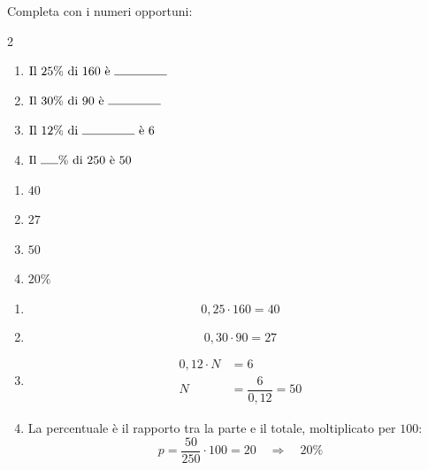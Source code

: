
\begin{question}[ID=1.2, subtitle={Completamento con percentuali — serie 2}, tags={percentuali}, difficulty=facile]
Completa con i numeri opportuni:
\begin{center}\begin{minipage}{0.92\linewidth}
\begin{multicols}{2}
\begin{enumerate}
\item $\text{Il }25\%\text{ di }160\text{ è } \rule{1.5cm}{0.4pt}$
\item $\text{Il }30\%\text{ di }90\text{ è } \rule{1.5cm}{0.4pt}$
\item $\text{Il }12\%\text{ di } \rule{1.5cm}{0.4pt} \text{ è }6$
\item $\text{Il } \rule{0.5cm}{0.4pt}\%\text{ di }250\text{ è }50$
\end{enumerate}
\end{multicols}
\end{minipage}\end{center}
\begin{solution}
\begin{enumerate}
    \item $40$
    \item $27$
    \item $50$
    \item $20\%$
\end{enumerate}
\end{solution}
\begin{explanation}
\begin{enumerate}
    \item \[ 0{,}25\cdot160=40 \]
    \item \[ 0{,}30\cdot90=27 \]
    \item \[\begin{aligned}
    0{,}12\cdot N &= 6\\
    N &= \dfrac{6}{0{,}12}=50
    \end{aligned}\]
    \item La percentuale è il rapporto tra la parte e il totale, moltiplicato per $100$:
    \[ p=\dfrac{50}{250}\cdot100=20 \quad\Rightarrow\quad 20\% \]
\end{enumerate}
\end{explanation}
\end{question}



